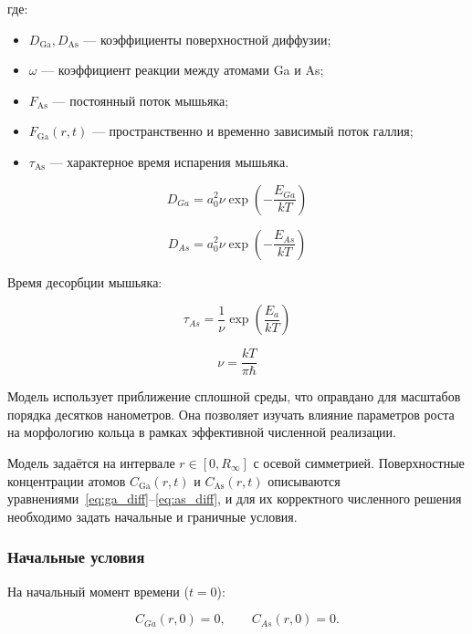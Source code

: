 \documentclass[14pt,oneside]{extarticle}
\begin{document}
где:
\begin{itemize}
  \item $D_{\text{Ga}}, D_{\text{As}}$ — коэффициенты поверхностной диффузии;
  \item $\omega$ — коэффициент реакции между атомами Ga и As;
  \item $F_{\text{As}}$ — постоянный поток мышьяка;
  \item $F_{\text{Ga}}(r,t)$ — пространственно и временно зависимый поток галлия;
  \item $\tau_{\text{As}}$ — характерное время испарения мышьяка.
\end{itemize}

\begin{equation}
D_{Ga}=a_{0}^{2}\nu\exp\left(-\frac{E_{Ga}}{kT}\right)
\end{equation}

\begin{equation}
D_{As}=a_{0}^{2}\nu\exp\left(-\frac{E_{As}}{kT}\right)
\end{equation}

Время десорбции мышьяка:

\begin{equation}
\tau_{As}=\frac{1}{\nu}\exp\left(\frac{E_{a}}{kT}\right)
\end{equation}

\begin{equation}
\nu=\frac{kT}{\pi\hbar}
\end{equation}

Модель использует приближение сплошной среды, что оправдано для масштабов порядка десятков нанометров. Она позволяет изучать влияние параметров роста на морфологию кольца в рамках эффективной численной реализации.

Модель задаётся на интервале $r \in [0, R_\infty]$ с осевой симметрией. Поверхностные концентрации атомов $C_{\text{Ga}}(r,t)$ и $C_{\text{As}}(r,t)$ описываются уравнениями~\eqref{eq:ga_diff}–\eqref{eq:as_diff}, и для их корректного численного решения необходимо задать начальные и граничные условия.

\subsubsection*{Начальные условия}

На начальный момент времени ($t = 0$): 

\begin{equation}
C_{Ga}\left(r,0\right)=0, \qquad
C_{As}\left(r,0\right)=0.
\end{equation}
\end{document}
